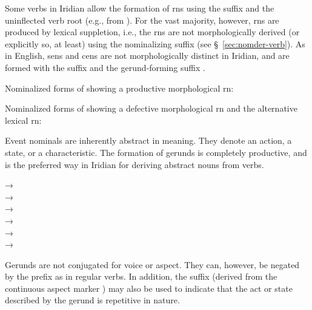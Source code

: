 Some verbs in Iridian allow the formation of {\sc rn}s using the suffix
 and the uninflected verb root (e.g.,  from
). For the vast majority, however, {\sc rn}s are produced
by lexical suppletion, i.e., the {\sc rn}s are not morphologically derived (or
explicitly so, at least) using the nominalizing suffix (see
\S~\ref{sec:nomder-verb}). As in English, {\sc sen}s and {\sc cen}s are not
morphologically distinct in Iridian, and are formed with the suffix 
and the gerund-forming suffix .

\pex
\a Nominalized forms of  showing a productive
morphological {\sc rn}:\smallskip\\

\a Nominalized forms of  showing a defective morphological
{\sc rn} and the alternative lexical {\sc rn}:\smallskip\\
\xe

Event nominals are inherently abstract in meaning. They denote an action, a
state, or a characteristic. The formation of gerunds is completely
productive, and is the preferred way in Iridian for deriving abstract nouns from
verbs.

\pex    
		 → \\
		 → \\
         → \\
         → \\
         → \\
         → \\
\xe

Gerunds are not conjugated for voice or aspect. They can, however, be negated by
the prefix  as in regular verbs. In addition, the suffix 
(derived from the continuous aspect marker ) may also be used to
indicate that the act or state described by the gerund is repetitive in nature.

